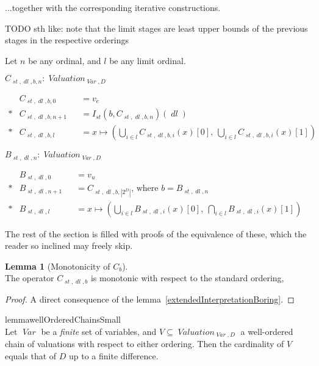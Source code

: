 \documentclass[oneside,12pt]{book}
\theoremstyle{definition}
\newtheorem{lemma}[theorem]{Lemma}
\theoremstyle{remark}
\newcommand\var[1]{\mathop{\mathit{#1}}\nolimits}
\newcommand{\st}{\var{st}}
\newcommand{\Var}{\var{Var}}
\newcommand{\Valuation}{\var{Valuation}}
\newcommand{\dl}{\var{dl}}
\begin{document}
...together with the corresponding iterative constructions.

TODO sth like: note that the limit stages are least upper bounds
of the previous stages in the respective orderings

\begin{defBox}
  Let $n$ be any ordinal, and $l$ be any limit ordinal.
  
  \medskip \noindent $C_{\st,\dl,b,n}\colon \Valuation_{\Var,D}$
  
  \nopagebreak \medskip \noindent
  $\begin{aligned}
    & C_{\st,\dl,b,0} & &= v_e \\*
    & C_{\st,\dl,b,n+1} & &= I_{\st}(b, C_{\st,\dl,b,n})(\dl) \\*
    & C_{\st,\dl,b,l} & &= x \mapsto (\bigcup_{i \in l}C_{\st,\dl,b,i}(x)[0],
      \ \bigcup_{i \in l}C_{\st,\dl,b,i}(x)[1])
  \end{aligned}$
  
  \medskip \noindent $B_{\st,\dl,n}\colon \Valuation_{\Var,D}$
  
  \nopagebreak \medskip \noindent
  $\begin{aligned}
    & B_{\st,\dl,0} & &= v_u \\*
    & B_{\st,\dl,n+1} & &= C_{\st,\dl,b,|2^D|} \text{, where } b = B_{\st,\dl,n} \\*
    & B_{\st,\dl,l} & &= x \mapsto (\bigcup_{i \in l}B_{\st,\dl,i}(x)[0],
      \ \bigcap_{i \in l}B_{\st,\dl,i}(x)[1])
  \end{aligned}$
  
\end{defBox}

The rest of the section is filled with proofs of the equivalence of these,
which the reader so inclined may freely skip.

\begin{lemma}[Monotonicity of $C_b$] \hfill \\
  The operator $C_{\st,\dl,b}$ is monotonic with respect to the standard ordering,
\end{lemma}

\begin{proof}
  A direct consequence of the lemma~\ref{extendedInterpretationBoring}.
\end{proof}

\begin{restatable}%
{lemma}{wellOrderedChainsSmall} \label{wellOrderedChainsSmall} \hfill \\
  Let $\Var$ be a \textit{finite} set of variables, and
  $V \subseteq \Valuation_{\Var,D}$ a well-ordered chain of valuations with
  respect to either ordering. Then the cardinality of $V$ equals that of $D$
  up to a finite difference.
\end{restatable}
\end{document}
